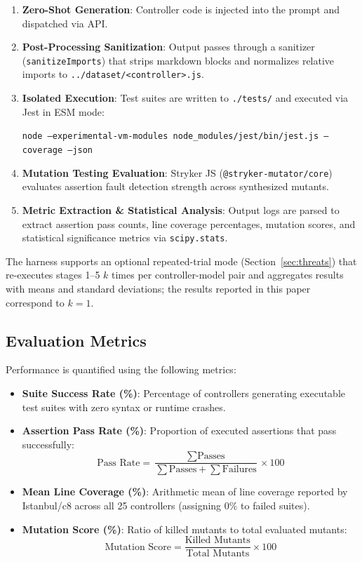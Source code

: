 \documentclass[conference]{IEEEtran}
\begin{document}
\begin{enumerate}
    \item \textbf{Zero-Shot Generation}: Controller code is injected into the prompt and dispatched via API.
    \item \textbf{Post-Processing Sanitization}: Output passes through a sanitizer (\texttt{sanitizeImports}) that strips markdown blocks and normalizes relative imports to \texttt{../dataset/<controller>.js}.
    \item \textbf{Isolated Execution}: Test suites are written to \texttt{./tests/} and executed via Jest in ESM mode:
    \begin{center}
    \texttt{node --experimental-vm-modules node\_modules/jest/bin/jest.js --coverage --json}
    \end{center}
    \item \textbf{Mutation Testing Evaluation}: Stryker JS (\texttt{@stryker-mutator/core}) evaluates assertion fault detection strength across synthesized mutants.
    \item \textbf{Metric Extraction \& Statistical Analysis}: Output logs are parsed to extract assertion pass counts, line coverage percentages, mutation scores, and statistical significance metrics via \texttt{scipy.stats}.
\end{enumerate}

The harness supports an optional repeated-trial mode (Section~\ref{sec:threats}) that re-executes stages 1--5 $k$ times per controller-model pair and aggregates results with means and standard deviations; the results reported in this paper correspond to $k=1$.

\subsection{Evaluation Metrics}

Performance is quantified using the following metrics:
\begin{itemize}
    \item \textbf{Suite Success Rate (\%)}: Percentage of controllers generating executable test suites with zero syntax or runtime crashes.
    \item \textbf{Assertion Pass Rate (\%)}: Proportion of executed assertions that pass successfully:
    \begin{equation}
    \text{Pass Rate} = \frac{\sum \text{Passes}}{\sum \text{Passes} + \sum \text{Failures}} \times 100
    \end{equation}
    \item \textbf{Mean Line Coverage (\%)}: Arithmetic mean of line coverage reported by Istanbul/c8 across all 25 controllers (assigning 0\% to failed suites).
    \item \textbf{Mutation Score (\%)}: Ratio of killed mutants to total evaluated mutants:
    \begin{equation}
    \text{Mutation Score} = \frac{\text{Killed Mutants}}{\text{Total Mutants}} \times 100
    \end{equation}
\end{itemize}
\end{document}
